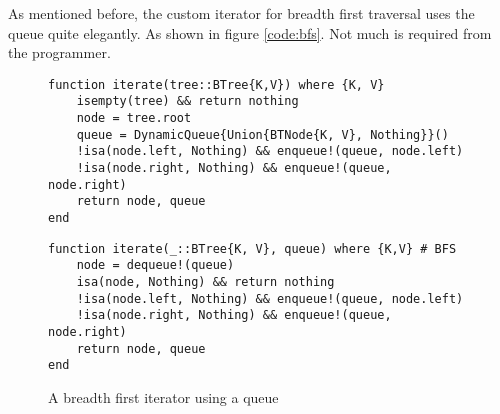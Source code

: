 \documentclass[a4paper, 11pt]{article}
\begin{document}
As mentioned before, the custom iterator for breadth first traversal uses the queue quite
elegantly. As shown in figure \autoref{code:bfs}. Not much is required from the programmer. 
    \begin{figure}[H]
        \centering
    \begin{verbatim}
function iterate(tree::BTree{K,V}) where {K, V}
    isempty(tree) && return nothing
    node = tree.root
    queue = DynamicQueue{Union{BTNode{K, V}, Nothing}}()
    !isa(node.left, Nothing) && enqueue!(queue, node.left)
    !isa(node.right, Nothing) && enqueue!(queue, node.right)
    return node, queue
end
    \end{verbatim}
    \begin{verbatim}
function iterate(_::BTree{K, V}, queue) where {K,V} # BFS
    node = dequeue!(queue)
    isa(node, Nothing) && return nothing
    !isa(node.left, Nothing) && enqueue!(queue, node.left)
    !isa(node.right, Nothing) && enqueue!(queue, node.right)
    return node, queue 
end
    \end{verbatim}
    \caption{A breadth first iterator using a queue}
    \label{code:bfs}
    \end{figure}
    


\end{document}
